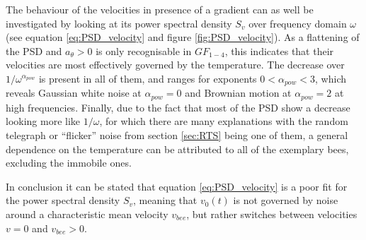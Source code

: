 The behaviour of the velocities in presence of a gradient can as well be investigated by looking at its power spectral density $S_{v}$ over frequency domain $\omega$ (see equation \ref{eq:PSD_velocity} and figure \ref{fig:PSD_velocity}). As a flattening of the PSD and $a_{\theta} > 0$ is only recognisable in $GF_{1-4}$, this indicates that their velocities are most effectively governed by the temperature. The decrease over $1/\omega^{\alpha_{pow}}$ is present in all of them, and ranges for exponents $0<\alpha_{pow}<3$, which reveals Gaussian white noise at $\alpha_{pow}=0$ and Brownian motion at $\alpha_{pow}=2$ at high frequencies. Finally, due to the fact that most of the PSD show a decrease looking more like $1/\omega$, for which there are many explanations with the random telegraph or ``flicker'' noise from section \ref{sec:RTS} being one of them, a general dependence on the temperature can be attributed to all of the exemplary bees, excluding the immobile ones.

In conclusion it can be stated that equation \ref{eq:PSD_velocity} is a poor fit for the power spectral density $S_{v}$, meaning that $v_{0}(t)$ is not governed by noise around a characteristic mean velocity $v_{bee}$, but rather switches between velocities $v=0$ and $v_{bee}>0$.

